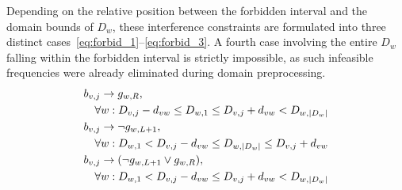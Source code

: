 \documentclass[letterpaper,journal]{IEEEtran}
\begin{document}
Depending on the relative position between the forbidden interval and the domain bounds of $D_w$, these interference constraints are formulated into three distinct cases~\eqref{eq:forbid_1}--\eqref{eq:forbid_3}. A fourth case involving the entire $D_w$ falling within the forbidden interval is strictly impossible, as such infeasible frequencies were already eliminated during domain preprocessing.
\begin{align}
    & b_{v,j} \rightarrow g_{w,R}, \notag \\
    & \quad \forall w: D_{v,j} - d_{vw} \le D_{w,1} \le D_{v,j} + d_{vw} < D_{w,|D_w|} \label{eq:forbid_1} \\
    & b_{v,j} \rightarrow \neg g_{w,L+1}, \notag \\
    & \quad \forall w: D_{w,1} < D_{v,j} - d_{vw} \le D_{w,|D_w|} \le D_{v,j} + d_{vw} \label{eq:forbid_2} \\
    & b_{v,j} \rightarrow (\neg g_{w,L+1} \lor g_{w,R}), \notag \\
    & \quad \forall w: D_{w,1} < D_{v,j} - d_{vw} \le D_{v,j} + d_{vw} < D_{w,|D_w|} \label{eq:forbid_3}
\end{align}
\end{document}
